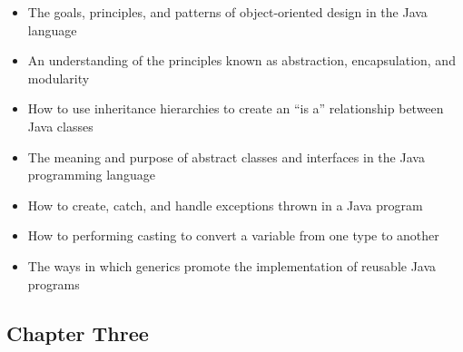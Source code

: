 \documentclass[11pt]{article}
\begin{document}
\begin{itemize}

  \setlength{\itemsep}{0.05in}

  \item The goals, principles, and patterns of object-oriented design in the
    Java language
  \item An understanding of the principles known as abstraction, encapsulation, and modularity
  \item How to use inheritance hierarchies to create an ``is a'' relationship
    between Java classes
  \item The meaning and purpose of abstract classes and interfaces in the Java
    programming language
  \item How to create, catch, and handle exceptions thrown in a Java program
  \item How to performing casting to convert a variable from one type to another
  \item The ways in which generics promote the implementation of reusable Java
    programs

\end{itemize}

\vspace*{-.2in}
\subsection*{Chapter Three}
\end{document}
